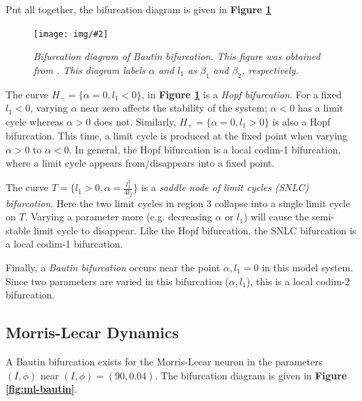 \documentclass[letterpaper,12pt]{article}
\numberwithin{table}{section}
\numberwithin{figure}{section}
\numberwithin{equation}{section}
\newcommand{\centerfig}[2]{\begin{center}\texttt{[image: img/\#2]}\end{center}}
\newcommand{\ccaption}[1]{\caption{\textit{#1}}}
\newcommand{\reffig}[1]{\textbf{Figure \ref{#1}}}
\begin{document}
\begin{flushleft}
    Put all together, the bifurcation diagram is given in \reffig{fig:bautin}
    \begin{figure}[h]

        \centering
    
        \centerfig{0.65}{bautin.jpg}

        \captionsetup{width=0.8\linewidth}
        \ccaption{Bifurcation diagram of Bautin bifurcation. This figure was obtained from \cite{kuznetsov}. This diagram labels $\alpha$ and $l_1$ as $\beta_1$ and $\beta_2$, respectively.}
    
        \label{fig:bautin}
    
    \end{figure}

    The curve $H_- = \{\alpha = 0, l_1 < 0\}$, in \reffig{fig:bautin} is a \textit{Hopf bifurcation}. For a fixed $l_1 < 0$, varying $\alpha$ near zero affects the stability of the system; $\alpha < 0$ has a limit cycle whereas $\alpha > 0$ does not. Similarly, $H_+ = \{\alpha = 0, l_1 > 0\}$ is also a Hopf bifurcation. This time, a limit cycle is produced at the fixed point when varying $\alpha > 0$ to $\alpha < 0$. In general, the Hopf bifurcation is a local codim-1 bifurcation, where a limit cycle appears from/disappears into a fixed point.

    The curve $T = \{l_1 > 0, \alpha = \frac{l_1^2}{4l_2}\}$ is a \textit{saddle node of limit cycles (SNLC) bifurcation}. Here the two limit cycles in region 3 collapse into a single limit cycle on $T$. Varying a parameter more (e.g. decreasing $\alpha$ or $l_1$) will cause the semi-stable limit cycle to disappear. Like the Hopf bifurcation, the SNLC bifurcation is a local codim-1 bifurcation.

    Finally, a \textit{Bautin bifurcation} occurs near the point $\alpha, l_1 = 0$ in this model system. Since two parameters are varied in this bifurcation ($\alpha, l_1$), this is a local codim-2 bifurcation.

    \subsection{Morris-Lecar Dynamics}

    A Bautin bifurcation exists for the Morris-Lecar neuron in the parameters $(I, \phi)$ near $(I, \phi) = (90, 0.04)$. The bifurcation diagram is given in \reffig{fig:ml-bautin}.
    \begin{figure}[h]


\end{figure}
\end{flushleft}
\end{document}
